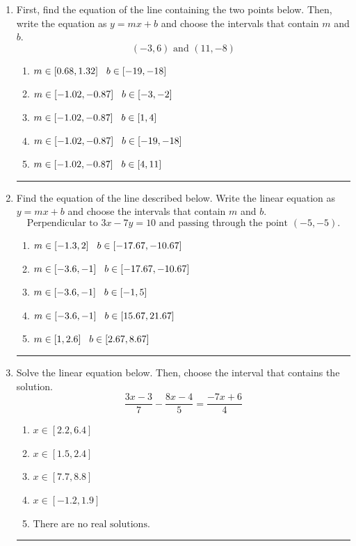 \documentclass[14pt]{extbook}
\newcommand{\litem}[1]{\item#1\hspace*{-1cm}\rule{\textwidth}{0.4pt}}
\begin{document}
\begin{enumerate}
{\begin{enumerate}[label=\Alph*.]
\end{enumerate} }
\litem{
First, find the equation of the line containing the two points below. Then, write the equation as $ y=mx+b $ and choose the intervals that contain $m$ and $b$.\[ (-3, 6) \text{ and } (11, -8) \]\begin{enumerate}[label=\Alph*.]
\item \( m \in [0.68, 1.32] \hspace*{3mm} b \in [-19, -18] \)
\item \( m \in [-1.02, -0.87] \hspace*{3mm} b \in [-3, -2] \)
\item \( m \in [-1.02, -0.87] \hspace*{3mm} b \in [1, 4] \)
\item \( m \in [-1.02, -0.87] \hspace*{3mm} b \in [-19, -18] \)
\item \( m \in [-1.02, -0.87] \hspace*{3mm} b \in [4, 11] \)

\end{enumerate} }
\litem{
Find the equation of the line described below. Write the linear equation as $ y=mx+b $ and choose the intervals that contain $m$ and $b$.\[ \text{Perpendicular to } 3 x - 7 y = 10 \text{ and passing through the point } (-5, -5). \]\begin{enumerate}[label=\Alph*.]
\item \( m \in [-1.3, 2] \hspace*{3mm} b \in [-17.67, -10.67] \)
\item \( m \in [-3.6, -1] \hspace*{3mm} b \in [-17.67, -10.67] \)
\item \( m \in [-3.6, -1] \hspace*{3mm} b \in [-1, 5] \)
\item \( m \in [-3.6, -1] \hspace*{3mm} b \in [15.67, 21.67] \)
\item \( m \in [1, 2.6] \hspace*{3mm} b \in [2.67, 8.67] \)

\end{enumerate} }
\litem{
Solve the linear equation below. Then, choose the interval that contains the solution.\[ \frac{3x -3}{7} - \frac{8x -4}{5} = \frac{-7x + 6}{4} \]\begin{enumerate}[label=\Alph*.]
\item \( x \in [2.2, 6.4] \)
\item \( x \in [1.5, 2.4] \)
\item \( x \in [7.7, 8.8] \)
\item \( x \in [-1.2, 1.9] \)
\item \( \text{There are no real solutions.} \)


\end{enumerate}}
\end{enumerate}
\end{document}
